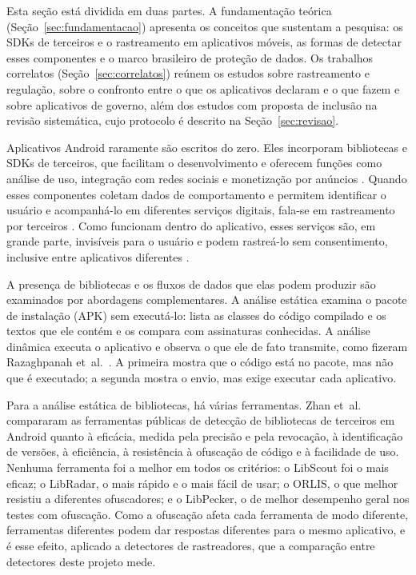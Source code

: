 \label{sec:revisao-bibliografica}

Esta seção está dividida em duas partes. A fundamentação teórica (Seção~\ref{sec:fundamentacao}) apresenta os conceitos que sustentam a pesquisa: os SDKs de terceiros e o rastreamento em aplicativos móveis, as formas de detectar esses componentes e o marco brasileiro de proteção de dados. Os trabalhos correlatos (Seção~\ref{sec:correlatos}) reúnem os estudos sobre rastreamento e regulação, sobre o confronto entre o que os aplicativos declaram e o que fazem e sobre aplicativos de governo, além dos estudos com proposta de inclusão na revisão sistemática, cujo protocolo é descrito na Seção~\ref{sec:revisao}.

\label{sec:fundamentacao}

\label{sec:ref-rastreamento}

Aplicativos Android raramente são escritos do zero. Eles incorporam bibliotecas e SDKs de terceiros, que facilitam o desenvolvimento e oferecem funções como análise de uso, integração com redes sociais e monetização por anúncios \cite{razaghpanah2018}. Quando esses componentes coletam dados de comportamento e permitem identificar o usuário e acompanhá-lo em diferentes serviços digitais, fala-se em rastreamento por terceiros \cite{binns2018}. Como funcionam dentro do aplicativo, esses serviços são, em grande parte, invisíveis para o usuário e podem rastreá-lo sem consentimento, inclusive entre aplicativos diferentes \cite{razaghpanah2018}.

\label{sec:ref-deteccao}

A presença de bibliotecas e os fluxos de dados que elas podem produzir são examinados por abordagens complementares. A análise estática examina o pacote de instalação (APK) sem executá-lo: lista as classes do código compilado e os textos que ele contém e os compara com assinaturas conhecidas. A análise dinâmica executa o aplicativo e observa o que ele de fato transmite, como fizeram Razaghpanah et~al.~\cite{razaghpanah2018}. A primeira mostra que o código está no pacote, mas não que é executado; a segunda mostra o envio, mas exige executar cada aplicativo.

Para a análise estática de bibliotecas, há várias ferramentas. Zhan et~al.~\cite{zhan2022} compararam as ferramentas públicas de detecção de bibliotecas de terceiros em Android quanto à eficácia, medida pela precisão e pela revocação, à identificação de versões, à eficiência, à resistência à ofuscação de código e à facilidade de uso. Nenhuma ferramenta foi a melhor em todos os critérios: o LibScout foi o mais eficaz; o LibRadar, o mais rápido e o mais fácil de usar; o ORLIS, o que melhor resistiu a diferentes ofuscadores; e o LibPecker, o de melhor desempenho geral nos testes com ofuscação. Como a ofuscação afeta cada ferramenta de modo diferente, ferramentas diferentes podem dar respostas diferentes para o mesmo aplicativo, e é esse efeito, aplicado a detectores de rastreadores, que a comparação entre detectores deste projeto mede.

